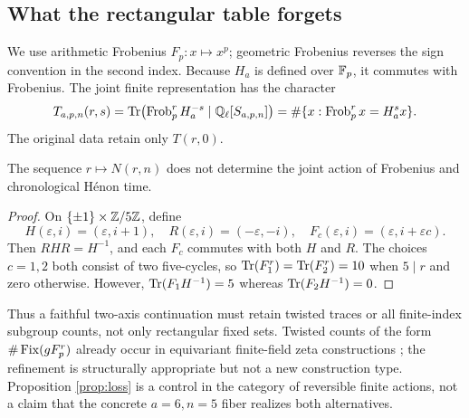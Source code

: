\subsection{What the rectangular table forgets}

We use arithmetic Frobenius $F_p:x\mapsto x^p$; geometric Frobenius reverses
the sign convention in the second index.  Because $H_a$ is defined over
$\mathbb F_p$, it commutes with Frobenius.  The joint
finite representation has the character
\begin{equation}\label{eq:joint}
 T_{a,p,n}(r,s)=
 \operatorname{Tr}\!\left(\operatorname{Frob}_p^rH_a^{-s}\mid\mathbb Q_\ell[S_{a,p,n}]\right)
 =\#\{x:\operatorname{Frob}_p^r x=H_a^s x\}.
\end{equation}
The original data retain only $T(r,0)$.

\begin{proposition}\label{prop:loss}
The sequence $r\mapsto N(r,n)$ does not determine the joint action of
Frobenius and chronological H\'enon time.
\end{proposition}

\begin{proof}
On $\{\pm1\}\times\mathbb Z/5\mathbb Z$, define
\[
 H(\varepsilon,i)=(\varepsilon,i+1),\quad
 R(\varepsilon,i)=(-\varepsilon,-i),\quad
 F_c(\varepsilon,i)=(\varepsilon,i+\varepsilon c).
\]
Then $RHR=H^{-1}$, and each $F_c$ commutes with both $H$ and $R$.  The choices
$c=1,2$ both consist of two five-cycles, so
$\operatorname{Tr}(F_1^r)=\operatorname{Tr}(F_2^r)=10$ when $5\mid r$ and zero otherwise.  However,
$\operatorname{Tr}(F_1H^{-1})=5$ whereas $\operatorname{Tr}(F_2H^{-1})=0$.
\end{proof}

Thus a faithful two-axis continuation must retain twisted traces or all
finite-index subgroup counts, not only rectangular fixed sets.  Twisted
counts of the form $\#\operatorname{Fix}(gF_p^r)$ already occur in equivariant finite-field
zeta constructions \citep[Definition~4.6]{walton2018}; the refinement is
structurally appropriate but not a new construction type.  Proposition
\ref{prop:loss} is a control in the category of reversible finite actions,
not a claim that the concrete $a=6,n=5$ fiber realizes both alternatives.
